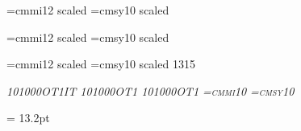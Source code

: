 {{{%
\def\chapnominalsize{17pt}
\setfont\chaprm{}
\setfont\chapit{}
\setfont\chapsl{}
\setfont\chaptt{}
\setfont\chapttsl{}
\setfont\chapsf{}
\let\chapbf=\chaprm
\setfont\chapsc{}
\font\chapi=cmmi12 scaled 
\font\chapsy=cmsy10 scaled 
\def\chapecsize{1728}

\def\secnominalsize{14pt}
\setfont\secrm{}
\setfont\secrmnotbold{}
\setfont\secit{}
\setfont\secsl{}
\setfont\sectt{}
\setfont\secttsl{}
\setfont\secsf{}
\let\secbf\secrm
\setfont\secsc{}
\font\seci=cmmi12 scaled 
\font\secsy=cmsy10 scaled 
\def\sececsize{1440}

\def\ssecnominalsize{13pt}
\setfont\ssecrm{}
\setfont\ssecit{}
\setfont\ssecsl{}
\setfont\ssectt{}
\setfont\ssecttsl{}
\setfont\ssecsf{}
\let\ssecbf\ssecrm
\setfont\ssecsc{}
\font\sseci=cmmi12 scaled \magstephalf
\font\ssecsy=cmsy10 scaled 1315
\def\ssececsize{1200}

\def\reducednominalsize{10pt}
\setfont\reducedrm{}
\setfont\reducedtt{}
\setfont\reducedbf{}
\setfont\reducedit\itshape{10}{1000}{OT1IT}
\setfont\reducedsl\slshape{10}{1000}{OT1}
\setfont\reducedsf{}
\setfont\reducedsc\scshape{10}{1000}{OT1}
\setfont\reducedttsl{}
\font\reducedi=cmmi10
\font\reducedsy=cmsy10
\def\reducedecsize{1000}

\textleading = 13.2pt %
\textfonts            %
\rm
} %


%
\def\definetextfontsizex{%
\def\textnominalsize{10pt}
\edef\mainmagstep{1000}
\setfont\textrm\rmshape{10}{\mainmagstep}{OT1}
\setfont\texttt\ttshape{10}{\mainmagstep}{OT1TT}
\setfont\textbf\bfshape{10}{\mainmagstep}{OT1}
\setfont\textit\itshape{10}{\mainmagstep}{OT1IT}
\setfont\textsl\slshape{10}{\mainmagstep}{OT1}
\setfont\textsf\sfshape{10}{\mainmagstep}{OT1}
\setfont\textsc\scshape{10}{\mainmagstep}{OT1}
\setfont\textttsl\ttslshape{10}{\mainmagstep}{OT1TT}
\font\texti=cmmi10 scaled \mainmagstep
\font\textsy=cmsy10 scaled \mainmagstep
\def\textecsize{1000}

}}}
